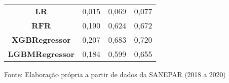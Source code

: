 \begin{table}[H]
\begin{tabular}{@{}clll@{}}
\textbf{LR}                       & 0,015                             & 0,069                            & 0,077                             \\
\textbf{RFR}                      & 0,190                             & 0,624                            & 0,672                             \\
\textbf{XGBRegressor}             & 0,207                             & 0,683                            & 0,720                             \\
\textbf{LGBMRegressor}            & 0,184                             & 0,599                            & 0,655                             \\ \bottomrule
	\end{tabular}

Fonte: Elaboração própria a partir de dados da SANEPAR (2018 a 2020)
\end{table}

